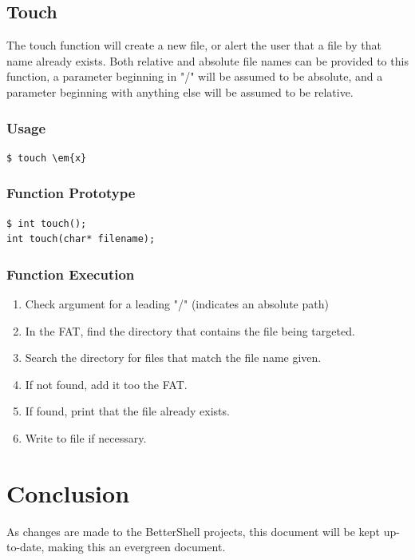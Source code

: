 \documentclass[12pt,letterpaper]{article}
\begin{document}
\subsection{Touch}
The touch function will create a new file, or alert the user that a file by that name already exists. Both relative and absolute file names can be provided to this function, a parameter beginning in "/" will be assumed to be absolute, and a parameter beginning with anything else will be assumed to be relative.
\subsubsection{Usage}
\begin{verbatim}
$ touch \em{x}
\end{verbatim}
\subsubsection{Function Prototype}
\begin{verbatim}
$ int touch();
int touch(char* filename);
\end{verbatim}
\subsubsection{Function Execution}
\begin{enumerate}
\item Check argument for a leading "/" (indicates an absolute path)
\item In the FAT, find the directory that contains the file being targeted.
\item Search the directory for files that match the file name given.
\item If not found, add it too the FAT.
\item If found, print that the file already exists.
\item Write to file if necessary.
\end{enumerate}

\section{Conclusion}
As changes are made to the BetterShell projects, this document will be kept up-to-date, making this an evergreen document.
\end{document}
